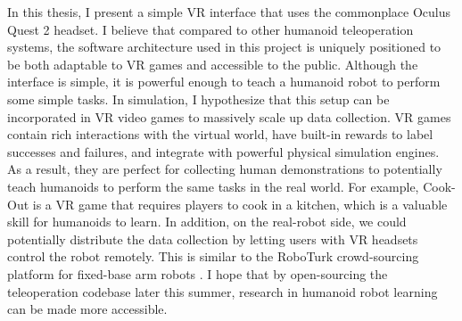 In this thesis, I present a simple VR interface that uses the commonplace Oculus Quest 2 headset. I believe that compared to other humanoid teleoperation systems, the software architecture used in this project is uniquely positioned to be both adaptable to VR games and accessible to the public. Although the interface is simple, it is powerful enough to teach a humanoid robot to perform some simple tasks. In simulation, I hypothesize that this setup can be incorporated in VR video games to massively scale up data collection. VR games contain rich interactions with the virtual world, have built-in rewards to label successes and failures, and integrate with powerful physical simulation engines. As a result, they are perfect for collecting human demonstrations to potentially teach humanoids to perform the same tasks in the real world. For example, Cook-Out is a VR game that requires players to cook in a kitchen, which is a valuable skill for humanoids to learn. In addition, on the real-robot side, we could potentially distribute the data collection by letting users with VR headsets control the robot remotely. This is similar to the RoboTurk crowd-sourcing platform for fixed-base arm robots \cite{mandlekar2018roboturk}. I hope that by open-sourcing the teleoperation codebase later this summer, research in humanoid robot learning can be made more accessible. 

